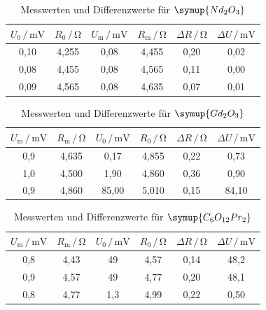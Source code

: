 \begin{table}
\centering
\caption{Messwerten und Differenzwerte für $\symup{Nd_2O_3}$}
\label{tab:Messdaten4}
\begin{tabular}{c c c c c c}
\toprule
$U_\text{0} \,/\, \si{\milli\volt}$ & $R_\text{0} \,/\, \si{\ohm}$ & $U_\text{m} \,/\, \si{\milli\volt}$& $R_\text{m} \,/\, \si{\ohm}$ & $\Delta R \,/\, \si{\ohm}$ & $\Delta U \,/\, \si{\milli\volt}$\\
\midrule
0,10 & 4,255 & 0,08 & 4,455 & 0,20 & 0,02\\
0,08 & 4,455 & 0,08 & 4,565 & 0,11 & 0,00\\
0,09 & 4,565 & 0,08 & 4,635 & 0,07 & 0,01\\
\bottomrule
\end{tabular}
\end{table}

\begin{table}
\centering
\caption{Messwerten und Differenzwerte für $\symup{Gd_2O_3}$}
\label{tab:Messdaten5}
\begin{tabular}{c c c c c c}
\toprule
$U_\text{m} \,/\, \si{\milli\volt}$ & $R_\text{m} \,/\, \si{\ohm}$ & $U_\text{0} \,/\, \si{\milli\volt}$& $R_\text{0} \,/\, \si{\ohm}$ & $\Delta R \,/\, \si{\ohm}$ & $\Delta U \,/\, \si{\milli\volt}$\\
\midrule
0,9 & 4,635 &  0,17 & 4,855 & 0,22 &  0,73\\
1,0 & 4,500 &  1,90 & 4,860 & 0,36 &  0,90\\
0,9 & 4,860 & 85,00 & 5,010 & 0,15 & 84,10\\
\bottomrule
\end{tabular}
\end{table}

\begin{table}
\centering
\caption{Messwerten und Differenzwerte für $\symup{C_6O_{12}Pr_2}$}
\label{tab:Messdaten6}
\begin{tabular}{c c c c c c}
\toprule
$U_\text{m} \,/\, \si{\milli\volt}$ & $R_\text{m} \,/\, \si{\ohm}$ & $U_\text{0} \,/\, \si{\milli\volt}$& $R_\text{0} \,/\, \si{\ohm}$ & $\Delta R \,/\, \si{\ohm}$ &$\Delta U \,/\, \si{\milli\volt}$ \\
\midrule
0,8 & 4,43 &  49 & 4,57 & 0,14 & 48,2\\
0,9 & 4,57 &  49 & 4,77 & 0,20 & 48,1\\
0,8 & 4,77 & 1,3 & 4,99 & 0,22 & 0,50\\
\bottomrule
\end{tabular}
\end{table}

